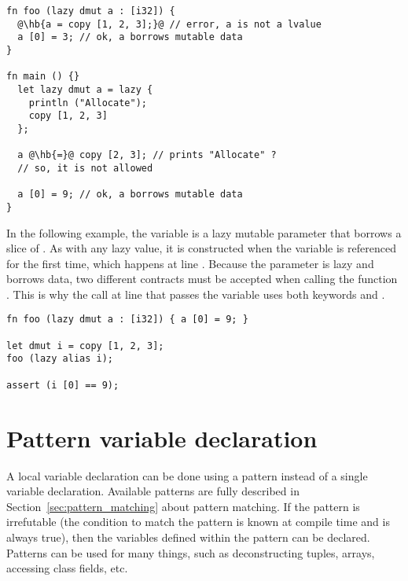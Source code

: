 \begin{lstlisting}[style=coloredverbatim, escapechar=@]
fn foo (lazy dmut a : [i32]) {
  @\hb{a = copy [1, 2, 3];}@ // error, a is not a lvalue
  a [0] = 3; // ok, a borrows mutable data
}

fn main () {}
  let lazy dmut a = lazy {
    println ("Allocate");
    copy [1, 2, 3]
  };

  a @\hb{=}@ copy [2, 3]; // prints "Allocate" ?
  // so, it is not allowed

  a [0] = 9; // ok, a borrows mutable data
}
\end{lstlisting}

In the following example, the variable  is a lazy mutable parameter
that borrows a slice of . As with any lazy value, it is constructed
when the variable  is referenced for the first time, which happens at
line . Because the parameter  is lazy and borrows data, two
different contracts must be accepted when calling the function . This
is why the call at line  that passes the variable  uses both
keywords  and .

\begin{lstlisting}[style=coloredverbatim, caption=Example of lazy mutable parameter]
fn foo (lazy dmut a : [i32]) { a [0] = 9; }

let dmut i = copy [1, 2, 3];
foo (lazy alias i);

assert (i [0] == 9);
\end{lstlisting}


\vfill%
\pagebreak

\section{Pattern variable declaration}
\label{sec:pattern_vdecl}

A local variable declaration can be done using a pattern instead of a single
variable declaration. Available patterns are fully described in
Section~\ref{sec:pattern_matching} about pattern matching. If the pattern is
irrefutable (the condition to match the pattern is known at compile time and is
always true), then the variables defined within the pattern can be declared.
Patterns can be used for many things, such as deconstructing tuples, arrays,
accessing class fields, etc.

